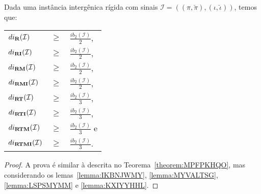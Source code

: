 \begin{theorem}\label{theorem:NFVKZGKW}
Dada uma instância intergênica rígida com sinais $\mathcal{I} = ((\pi,\breve\pi),(\iota,\breve\iota))$, temos que:

\begin{tabular}{lll}
  $di_{\textbf{R}}(\mathcal{I})$      & $ \ge $ & $\frac{ib_2(\mathcal{I})}{2}$,  \\ 
  $di_{\textbf{RI}}(\mathcal{I})$     & $ \ge $ & $\frac{ib_2(\mathcal{I})}{2}$,  \\
  $di_{\textbf{RM}}(\mathcal{I})$     & $ \ge $ & $\frac{ib_2(\mathcal{I})}{2}$,  \\
  $di_{\textbf{RMI}}(\mathcal{I})$    & $ \ge $ & $\frac{ib_2(\mathcal{I})}{2}$,  \\
  $di_{\textbf{RT}}(\mathcal{I})$     & $ \ge $ & $\frac{ib_2(\mathcal{I})}{3}$,  \\
  $di_{\textbf{RTI}}(\mathcal{I})$    & $ \ge $ & $\frac{ib_2(\mathcal{I})}{3}$,  \\
  $di_{\textbf{RTM}}(\mathcal{I})$    & $ \ge $ & $\frac{ib_2(\mathcal{I})}{3}$ e \\
  $di_{\textbf{RTMI}}(\mathcal{I})$ & $ \ge $ & $\frac{ib_2(\mathcal{I})}{3}$.    \\
\end{tabular}
\end{theorem}
\begin{proof}
A prova é similar à descrita no Teorema~\ref{theorem:MPFPKHQO}, mas considerando os lemas~\ref{lemma:IKBNJWMY}, \ref{lemma:MYVALTSG}, \ref{lemma:LSPSMYMM} e \ref{lemma:KXIYYHHL}.
\end{proof}

